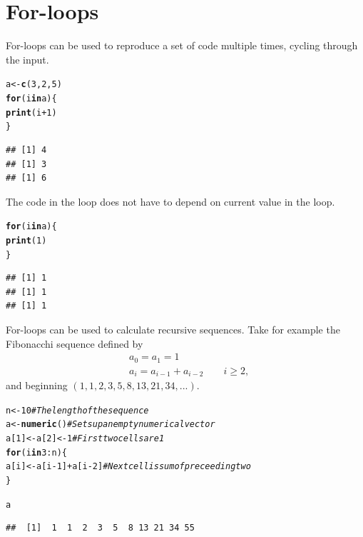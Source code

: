 \documentclass{article}\usepackage[]{graphicx}\usepackage[]{color}
\makeatletter
\newcommand{\hlnum}[1]{\textcolor[rgb]{0.686,0.059,0.569}{#1}}%
\newcommand{\hlcom}[1]{\textcolor[rgb]{0.678,0.584,0.686}{\textit{#1}}}%
\newcommand{\hlopt}[1]{\textcolor[rgb]{0,0,0}{#1}}%
\newcommand{\hlstd}[1]{\textcolor[rgb]{0.345,0.345,0.345}{#1}}%
\newcommand{\hlkwa}[1]{\textcolor[rgb]{0.161,0.373,0.58}{\textbf{#1}}}%
\newcommand{\hlkwb}[1]{\textcolor[rgb]{0.69,0.353,0.396}{#1}}%
\newcommand{\hlkwd}[1]{\textcolor[rgb]{0.737,0.353,0.396}{\textbf{#1}}}%
\newenvironment{kframe}{%
 \def\at@end@of@kframe{}%
 \ifinner\ifhmode%
  \def\at@end@of@kframe{\end{minipage}}%
  \begin{minipage}{\columnwidth}%
 \fi\fi%
 \def\FrameCommand##1{\hskip\@totalleftmargin \hskip-\fboxsep
 \colorbox{shadecolor}{##1}\hskip-\fboxsep
     \hskip-\linewidth \hskip-\@totalleftmargin \hskip\columnwidth}%
 \MakeFramed {\advance\hsize-\width
   \@totalleftmargin\z@ \linewidth\hsize
   \@setminipage}}%
 {\par\unskip\endMakeFramed%
 \at@end@of@kframe}
\newenvironment{knitrout}{}{} %
\makeatother
\begin{document}
\section{For-loops}
For-loops can be used to reproduce a set of code multiple times, cycling through the input.
\begin{knitrout}
\color{fgcolor}\begin{kframe}
\begin{alltt}
\hlstd{a} \hlkwb{<-} \hlkwd{c}\hlstd{(}\hlnum{3}\hlstd{,} \hlnum{2}\hlstd{,} \hlnum{5}\hlstd{)}
\hlkwa{for}\hlstd{(i} \hlkwa{in} \hlstd{a)\{}
  \hlkwd{print}\hlstd{(i} \hlopt{+} \hlnum{1}\hlstd{)}
\hlstd{\}}
\end{alltt}
\begin{verbatim}
## [1] 4
## [1] 3
## [1] 6
\end{verbatim}
\end{kframe}
\end{knitrout}
The code in the loop does not have to depend on current value in the loop.
\begin{knitrout}
\color{fgcolor}\begin{kframe}
\begin{alltt}
\hlkwa{for}\hlstd{(i} \hlkwa{in} \hlstd{a)\{}
  \hlkwd{print}\hlstd{(}\hlnum{1}\hlstd{)}
\hlstd{\}}
\end{alltt}
\begin{verbatim}
## [1] 1
## [1] 1
## [1] 1
\end{verbatim}
\end{kframe}
\end{knitrout}
For-loops can be used to calculate recursive sequences. Take for example the Fibonacchi sequence defined by
\begin{align*}
& a_0 = a_1 = 1 \\
& a_i = a_{i-1} + a_{i-2} \qquad i \geq 2,
\end{align*}
and beginning $(1,1,2,3,5,8,13,21,34,...)$.
\begin{knitrout}
\color{fgcolor}\begin{kframe}
\begin{alltt}
\hlstd{n} \hlkwb{<-} \hlnum{10} \hlcom{#The length of the sequence}
\hlstd{a} \hlkwb{<-} \hlkwd{numeric}\hlstd{()} \hlcom{#Sets up an empty numerical vector}
\hlstd{a[}\hlnum{1}\hlstd{]} \hlkwb{<-} \hlstd{a[}\hlnum{2}\hlstd{]} \hlkwb{<-} \hlnum{1} \hlcom{#First two cells are 1}
\hlkwa{for}\hlstd{(i} \hlkwa{in} \hlnum{3}\hlopt{:}\hlstd{n)\{}
  \hlstd{a[i]} \hlkwb{<-} \hlstd{a[i}\hlopt{-}\hlnum{1}\hlstd{]} \hlopt{+} \hlstd{a[i}\hlopt{-}\hlnum{2}\hlstd{]} \hlcom{#Next cell is sum of preceeding two}
\hlstd{\}}

\hlstd{a}
\end{alltt}
\begin{verbatim}
##  [1]  1  1  2  3  5  8 13 21 34 55
\end{verbatim}
\end{kframe}
\end{knitrout}
\end{document}
